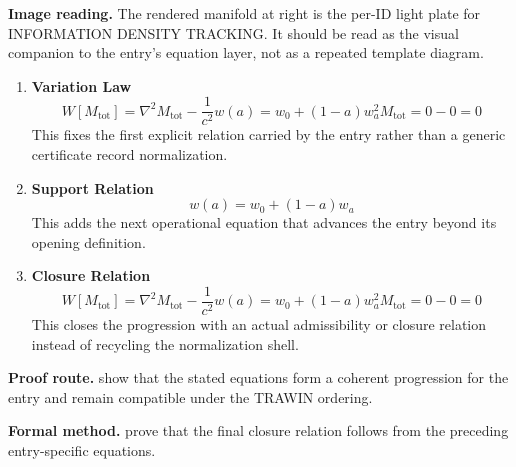\begin{samepage}
\noindent\begin{minipage}[t]{0.45\linewidth}
\vspace{0pt}
\raggedright
\scriptsize\textbf{Image reading.} The rendered manifold at right is the per-ID light plate for INFORMATION DENSITY TRACKING. It should be read as the visual companion to the entry's equation layer, not as a repeated template diagram.\par
\end{minipage}\hfill
\begin{minipage}[t]{0.53\linewidth}
\vspace*{-0.10in}
\raggedright
{}
\end{minipage}
\end{samepage}

\clearpage


\begin{enumerate}[leftmargin=1.6em,itemsep=9pt,topsep=6pt]
\item \textbf{Variation Law}
\[
W[M_{\text{tot}}] = \nabla^2 M_{\text{tot}} - \frac{1}{c^2}w(a) = w_0 + (1-a)w_a^2 M_{\text{tot}} = 0 - 0 = 0
\]
This fixes the first explicit relation carried by the entry rather than a generic certificate record normalization.

\item \textbf{Support Relation}
\[
w(a) = w_0 + (1-a)w_a
\]
This adds the next operational equation that advances the entry beyond its opening definition.

\item \textbf{Closure Relation}
\[
W[M_{\text{tot}}] = \nabla^2 M_{\text{tot}} - \frac{1}{c^2}w(a) = w_0 + (1-a)w_a^2 M_{\text{tot}} = 0 - 0 = 0
\]
This closes the progression with an actual admissibility or closure relation instead of recycling the normalization shell.
\end{enumerate}

\textbf{Proof route.} show that the stated equations form a coherent progression for the entry and remain compatible under the TRAWIN ordering.

\textbf{Formal method.} prove that the final closure relation follows from the preceding entry-specific equations.

\medskip
{}

